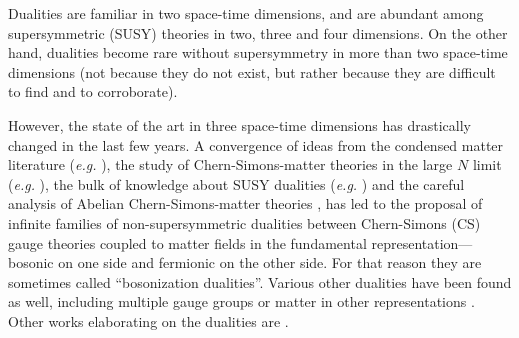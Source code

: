 \documentclass[a4paper, 12pt]{article}
\newcommand{\eg}{\textit{e.g.}}
\numberwithin{equation}{section}
\begin{document}
Dualities are familiar in two space-time dimensions, and are abundant among supersymmetric (SUSY) theories in two, three and four dimensions. On the other hand, dualities become rare without supersymmetry in more than two space-time dimensions (not because they do not exist, but rather because they are difficult to find and to corroborate).

However, the state of the art in three space-time dimensions has drastically changed in the last few years. A convergence of ideas from the condensed matter literature (\eg{}  \cite{Peskin:1977kp, Dasgupta:1981zz, Barkeshli:2014ida, Son:2015xqa, Wang:2015qmt, Potter:2015cdn, Wang:2016gqj}), the study of Chern-Simons-matter theories in the large $N$ limit (\eg{} \cite{Aharony:2011jz, Giombi:2011kc, Aharony:2012nh, Jain:2013gza}), the bulk of knowledge about SUSY dualities (\eg{} \cite{Intriligator:1996ex, deBoer:1996mp, Aharony:1997bx, Aharony:1997gp, Giveon:2008zn, Benini:2011mf}) and the careful analysis of Abelian Chern-Simons-matter theories \cite{Karch:2016sxi, Murugan:2016zal, Seiberg:2016gmd}, has led to the proposal of infinite families of non-supersymmetric dualities \cite{Aharony:2015mjs, Hsin:2016blu, Metlitski:2016dht, Aharony:2016jvv, Komargodski:2017keh} between Chern-Simons (CS) gauge theories coupled to matter fields in the fundamental representation---bosonic on one side and fermionic on the other side. For that reason they are sometimes called ``bosonization dualities''. Various other dualities have been found as well, including multiple gauge groups \cite{Karch:2016aux, Jensen:2017dso} or matter in other representations \cite{Gomis:2017ixy}. Other works elaborating on the dualities are \cite{Gur-Ari:2015pca, Kachru:2016aon, Benini:2017dus, Wang:2017txt, Chen:2017lkr, Gaiotto:2017tne, Jensen:2017xbs, Armoni:2017jkl, Cordova:2017vab, Aharony:toappear}.
\end{document}
